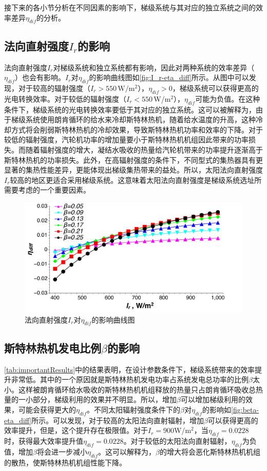 接下来的各小节分析在不同因素的影响下，梯级系统与其对应的独立系统之间的效率差异$\eta_{dif}$的分析。
\subsection{法向直射强度$I_r$的影响}
\label{sec:I_r}

法向直射强度$I_r$对梯级系统和独立系统都有影响，因此对两种系统的效率差异（$\eta_{dif}$）也会有影响。$I_r$对$\eta_{dif}$的影响曲线图如\autoref{fig:I_r-eta_diff}所示。从图中可以发现，对于较高的辐射强度（$I_r > 550\,\mathrm{W/m^2}$），$\eta_{dif}>0$，梯级系统可以获得更高的光电转换效率。对于较低的辐射强度（$I_r < 550\,$W/m$^2$），$\eta_{dif}$可能为负值。在这种条件下，梯级系统的光电转换效率要低于其对应的独立系统。这可以被解释为，由于梯级系统使用朗肯循环的给水来冷却斯特林热机，随着给水温度的升高，这种冷却方式将会削弱斯特林热机的冷却效果，导致斯特林热机功率和效率的下降。对于较低的辐射强度，汽轮机功率的增加量要小于斯特林热机机组因此带来的功率损失。而随着辐射强度的增大，凝结水吸收的热量给汽轮机带来的功率提升逐渐高于斯特林热机的功率损失。此外，在高辐射强度的条件下，不同型式的集热器具有更显著的集热性能差异，更能体现出梯级集热带来的益处。所以，太阳法向直射强度$I_r$较高的地区更适合采用梯级系统。这意味着太阳法向直射强度是梯级系统选址所需要考虑的一个重要因素。
\begin{figure}[htbp]
	\centering
	\includegraphics[width = 0.9\columnwidth, angle = 0]{fig/I_r-eta_diff}
	\caption{法向直射强度$I_r$对$\eta_{dif}$的影响曲线图}
	\label{fig:I_r-eta_diff}
\end{figure}

\subsection{斯特林热机发电比例$\beta$的影响}

\autoref{tab:importantResults}中的结果表明，在设计参数条件下，梯级系统带来的效率提升非常低。其中的一个原因就是斯特林热机发电功率占系统发电总功率的比例$\beta$太小。这样被朗肯循环给水吸收的斯特林热机机组释放的热量只占朗肯循环吸收总热量的一小部分，梯级利用的效果并不明显。所以，增加$\beta$可以增加梯级利用的效果，可能会获得更大的$\eta_{dif}$。不同太阳辐射强度条件下的$\beta$对$\eta_{dif}$的影响如\autoref{fig:beta-eta_diff}所示。可以发现，对于较高的太阳法向直射辐射，增加$\beta$可以获得更高的效率提升，但是，这个提升存在极限值。对于$I_r=900$W/m$^2$，当$\eta_{dif}=0.0228$时，获得最大效率提升值$\eta_{dif}=0.0228$。对于较低的太阳法向直射辐射，$\eta_{dif}$为负值，增加$\beta$将会进一步减小$\eta_{dif}$。这可以解释为，$\beta$的增大将会恶化斯特林热机机组的散热，使斯特林热机机组性能下降。

